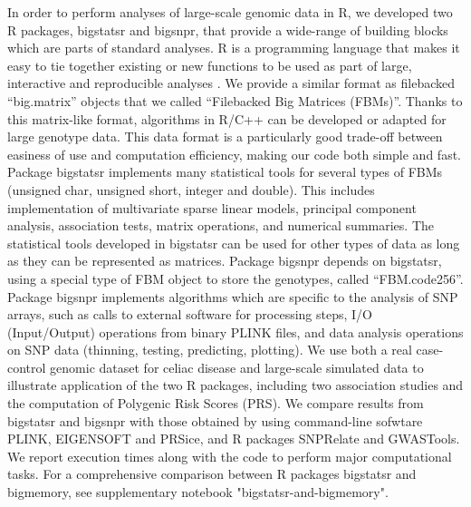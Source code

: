 \documentclass{bioinfo}
\begin{document}
In order to perform analyses of large-scale genomic data in R, we developed two R packages, bigstatsr and bigsnpr, that provide a wide-range of building blocks which are parts of standard analyses. 
R is a programming language that makes it easy to tie together existing or new functions to be used as part of large, interactive and reproducible analyses \cite[]{R2017}.
We provide a similar format as filebacked ``big.matrix'' objects that we called ``Filebacked Big Matrices (FBMs)''. Thanks to this matrix-like format, algorithms in R/C++ can be developed or adapted for large genotype data. This data format is a particularly good trade-off between easiness of use and computation efficiency, making our code both simple and fast.
Package bigstatsr implements many statistical tools for several types of FBMs (unsigned char, unsigned short, integer and double). This includes implementation of multivariate sparse linear models, principal component analysis, association tests, matrix operations, and numerical summaries. The statistical tools developed in bigstatsr can be used for other types of data as long as they can be represented as matrices. Package bigsnpr depends on bigstatsr, using a special type of FBM object to store the genotypes, called ``FBM.code256''. Package bigsnpr implements algorithms which are specific to the analysis of SNP arrays, such as calls to external software for processing steps, I/O (Input/Output) operations from binary PLINK files, and data analysis operations on SNP data (thinning, testing, predicting, plotting). 
We use both a real case-control genomic dataset for celiac disease and large-scale simulated data to illustrate application of the two R packages, including two association studies and the computation of Polygenic Risk Scores (PRS). We compare results from bigstatsr and bigsnpr with those obtained by using command-line sofwtare PLINK, EIGENSOFT and PRSice, and R packages SNPRelate and GWASTools. We report execution times along with the code to perform major computational tasks. 
For a comprehensive comparison between R packages bigstatsr and bigmemory, see supplementary notebook "bigstatsr-and-bigmemory".
\end{document}
